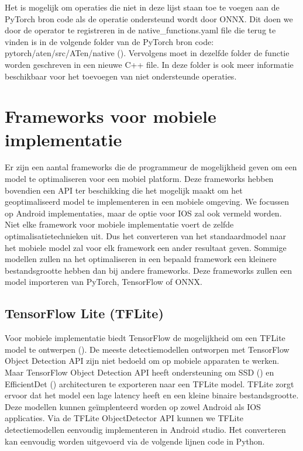 Het is mogelijk om operaties die niet in deze lijst staan toe te voegen aan de PyTorch bron code als de operatie ondersteund wordt door ONNX.
Dit doen we door de operator te registreren in de native\_functions.yaml file die terug te vinden is in de volgende folder van de PyTorch bron code: pytorch/aten/src/ATen/native (\cite{pytorch_atensrcatennative_2021}).
Vervolgens moet in dezelfde folder de functie worden geschreven in een nieuwe C++ file.
In deze folder is ook meer informatie beschikbaar voor het toevoegen van niet ondersteunde operaties.

\section{Frameworks voor mobiele implementatie}
Er zijn een aantal frameworks die de programmeur de mogelijkheid geven om een model te optimaliseren voor een mobiel platform.
Deze frameworks hebben bovendien een API ter beschikking die het mogelijk maakt om het geoptimaliseerd model te implementeren in een mobiele omgeving.
We focussen op Android implementaties, maar de optie voor IOS zal ook vermeld worden.
Niet elke framework voor mobiele implementatie voert de zelfde optimalisatietechnieken uit.
Dus het converteren van het standaardmodel naar het mobiele model zal voor elk framework een ander resultaat geven.
Sommige modellen zullen na het optimaliseren in een bepaald framework een kleinere bestandsgrootte hebben dan bij andere frameworks.
Deze frameworks zullen een model importeren van PyTorch, TensorFlow of ONNX.

\subsection{TensorFlow Lite (TFLite)} \label{tf}
Voor mobiele implementatie biedt TensorFlow de mogelijkheid om een TFLite model te ontwerpen (\cite{tensorflow2015-whitepaper}).
De meeste detectiemodellen ontworpen met TensorFlow Object Detection API zijn niet bedoeld om op mobiele apparaten te werken.
Maar TensorFlow Object Detection API heeft ondersteuning om SSD  (\cite{liu_ssd_2016}) en EfficientDet (\cite{tan_efficientdet_2020}) architecturen te exporteren naar een TFLite model.
%
TFLite zorgt ervoor dat het model een lage latency heeft en een kleine binaire bestandsgrootte.
Deze modellen kunnen ge\"implenteerd worden op zowel Android als IOS applicaties.
Via de TFLite ObjectDetector API kunnen we TFLite detectiemodellen eenvoudig implementeren in Android studio.
Het converteren kan eenvoudig worden uitgevoerd via de volgende lijnen code in Python.

